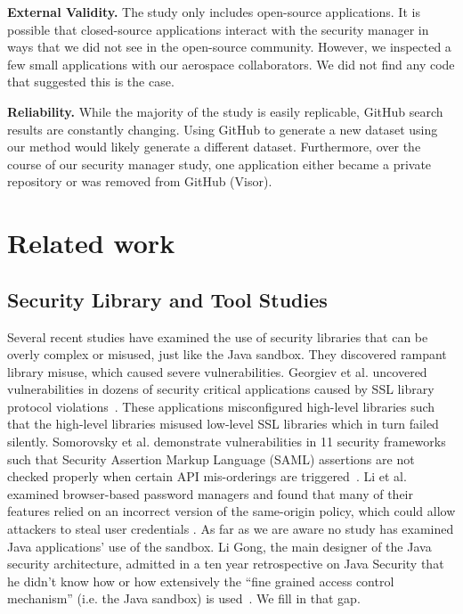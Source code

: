 \documentclass{sig-alternate}
\newcommand{\minisec}[1]{\vspace{2ex}\noindent\textbf{#1}}
\begin{document}
\minisec{External Validity.}
The study only includes open-source applications. It is possible
that closed-source applications interact with the security manager
in ways that we did not see in the open-source community. However,
we inspected a few small applications with our aerospace collaborators.
We did not find any code that suggested this is the case. 

\minisec{Reliability.}
While the majority of the study is easily replicable, GitHub search results are constantly
changing. Using GitHub to generate a new dataset using our method
would likely generate a different dataset. Furthermore, over the course of our security
manager study, one application either became a private repository
or was removed from GitHub (Visor).

\section{Related work}
\label{sec:related}

\subsection{Security Library and Tool Studies}

Several recent studies have examined the use of security libraries that can be overly complex or misused, just like the Java sandbox. They discovered rampant library misuse, which caused severe vulnerabilities.
Georgiev et al. uncovered vulnerabilities in dozens of security critical
applications caused by SSL library protocol violations~\cite{georgiev12most-dangerous}.
These applications misconfigured high-level libraries such that the
high-level libraries misused low-level SSL libraries which in turn
failed silently. Somorovsky et al. demonstrate vulnerabilities in
11 security frameworks such that Security Assertion Markup Language
(SAML) assertions are not checked properly when certain API mis-orderings
are triggered~\cite{somorovsky12breaking}. Li et al. examined browser-based
password managers and found that many of their features relied on
an incorrect version of the same-origin policy, which could allow
attackers to steal user credentials \cite{li2014emperor}. As far
as we are aware no study has examined Java applications' use of the
sandbox. Li Gong, the main designer of the Java security architecture,
admitted in a ten year retrospective on Java Security that he didn't
know how or how extensively the ``fine grained access control mechanism''
(i.e. the Java sandbox) is used~\cite{gong2009java}. We fill in that
gap. 
\end{document}
